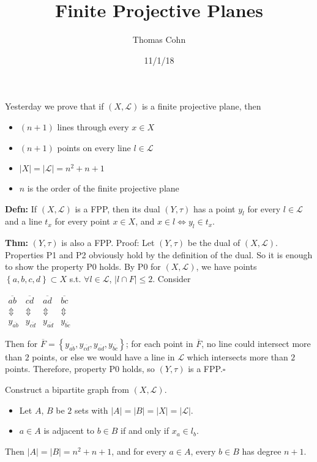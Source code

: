 \documentclass[10pt,letterpaper]{article}
\author{Thomas Cohn}
\title{Finite Projective Planes}
\date{11/1/18} %
\newcommand{\n}{\hfill\break}
\newcommand{\defn}[1]{\par\noindent\settowidth{\hangindent}{\textbf{Defn: }}\textbf{Defn: }#1\n}
\newcommand{\thm}[1]{\par\noindent\settowidth{\hangindent}{\textbf{Thm: }}\textbf{Thm: }#1\n}
\newcommand{\proven}{\;$\square$\n}
\newcommand{\inlineeq}[1]{\centerline{$\displaystyle #1$}}
\newcommand{\card}[1]{\left|#1\right|}
\newcommand{\set}[1]{\left\{#1\right\}}
\newcommand{\st}{s.t.}
\begin{document}
\maketitle
\setlength\RaggedRightParindent{\parindent}
\RaggedRight

\par\noindent Yesterday we prove that if $(X,\mathscr{L})$ is a finite projective plane, then
\begin{itemize}
	\item $(n+1)$ lines through every $x\in{}X$
	\item $(n+1)$ points on every line $l\in\mathscr{L}$
	\item $\card{X}=\card{\mathscr{L}}=n^{2}+n+1$
	\item $n$ is the order of the finite projective plane
\end{itemize}

\defn{If $(X,\mathscr{L})$ is a FPP, then its dual $(Y,\tau)$ has a point $y_{l}$ for every $l\in\mathscr{L}$ and a line $t_{x}$ for every point $x\in{}X$, and $x\in{}l\Leftrightarrow{}y_{l}\in{}t_{x}$.}

\thm{$(Y,\tau)$ is also a FPP.\n
Proof: Let $(Y,\tau)$ be the dual of $(X,\mathscr{L})$. Properties P1 and P2 obviously hold by the definition of the dual. So it is enough to show the property P0 holds.\n
By P0 for $(X,\mathscr{L})$, we have points $\set{a,b,c,d}\subset{}X$ \st{} $\forall{}l\in\mathscr{L}$, $\card{l\cap{}F}\le{}2$. Consider\n
\inlineeq{\begin{array}{cccc}\overline{ab} & \overline{cd} & \overline{ad} & \overline{bc}\\ \Updownarrow & \Updownarrow & \Updownarrow & \Updownarrow\\ y_{\overline{ab}} & y_{\overline{cd}} & y_{\overline{ad}} & y_{\overline{bc}}\end{array}}
Then for $\overline{F}=\set{y_{\overline{ab}},y_{\overline{cd}},y_{\overline{ad}},y_{\overline{bc}}}$; for each point in $\overline{F}$, no line could intersect more than $2$ points, or else we would have a line in $\mathscr{L}$ which intersects more than $2$ points.\n
Therefore, property P0 holds, so $(Y,\tau)$ is a FPP.\proven}

\par\noindent Construct a bipartite graph from $(X,\mathscr{L})$.\n
\begin{itemize}
	\item Let $A$, $B$ be $2$ sets with $\card{A}=\card{B}=\card{X}=\card{\mathscr{L}}$.
	\item $a\in{}A$ is adjacent to $b\in{}B$ if and only if $x_{a}\in{}l_{b}$.
\end{itemize}
\par\noindent Then $\card{A}=\card{B}=n^{2}+n+1$, and for every $a\in{}A$, every $b\in{}B$ has degree $n+1$.\n
\end{document}
